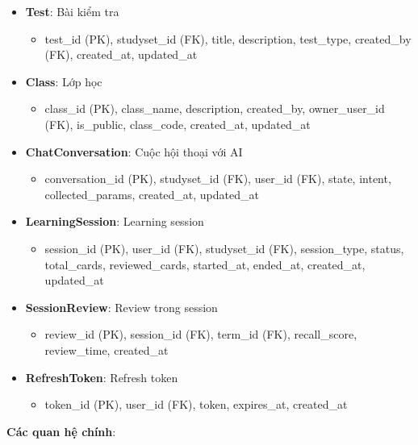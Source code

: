 \documentclass[../DoAn.tex]{subfiles}
\begin{document}
\begin{itemize}
    \item \textbf{Test}: Bài kiểm tra
    \begin{itemize}
        \item test\_id (PK), studyset\_id (FK), title, description, test\_type, created\_by (FK), created\_at, updated\_at
    \end{itemize}
    
    \item \textbf{Class}: Lớp học
    \begin{itemize}
        \item class\_id (PK), class\_name, description, created\_by, owner\_user\_id (FK), is\_public, class\_code, created\_at, updated\_at
    \end{itemize}
    
    \item \textbf{ChatConversation}: Cuộc hội thoại với AI
    \begin{itemize}
        \item conversation\_id (PK), studyset\_id (FK), user\_id (FK), state, intent, collected\_params, created\_at, updated\_at
    \end{itemize}
    
    \item \textbf{LearningSession}: Learning session
    \begin{itemize}
        \item session\_id (PK), user\_id (FK), studyset\_id (FK), session\_type, status, total\_cards, reviewed\_cards, started\_at, ended\_at, created\_at, updated\_at
    \end{itemize}
    
    \item \textbf{SessionReview}: Review trong session
    \begin{itemize}
        \item review\_id (PK), session\_id (FK), term\_id (FK), recall\_score, review\_time, created\_at
    \end{itemize}
    
    \item \textbf{RefreshToken}: Refresh token
    \begin{itemize}
        \item token\_id (PK), user\_id (FK), token, expires\_at, created\_at
    \end{itemize}
\end{itemize}

\textbf{Các quan hệ chính}:
\end{document}
